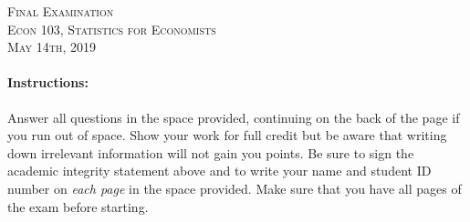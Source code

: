 \documentclass[addpoints,12pt]{exam}
\begin{document}
\begin{center}
\textsc{\large Final Examination\\ \normalsize Econ 103, Statistics for Economists \\ \vspace{0.5em} May 14th, 2019}

\vspace{2em}



\end{center}


\vspace{2em}
\begin{center}
\end{center}
\vspace{0.2in}

\vspace{0.2in}

\noindent{}

\vspace{0.2in}

\noindent{}
\hfill
{}

\vspace{2em}

\begin{center}
  \gradetable[h][questions]
\end{center}

\vspace{2em}

\paragraph{Instructions:} Answer all questions in the space provided, continuing on the back of the page if you run out of space. Show your work for full credit but be aware that writing down irrelevant information will not gain you points. Be sure to sign the academic integrity statement above and to write your name and student ID number on \emph{each page} in the space provided. Make sure that you have all pages of the exam before starting.
\end{document}

